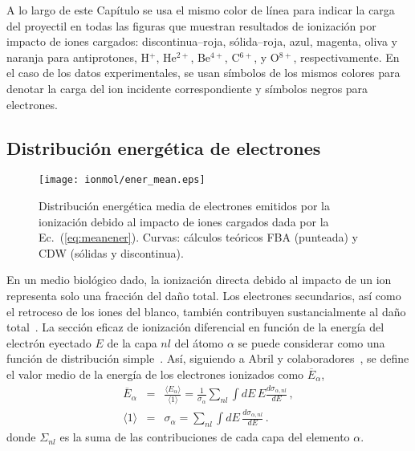 A lo largo de este Capítulo se usa el mismo color de línea para indicar 
la carga del proyectil en todas las figuras que muestran resultados de 
ionización por impacto de iones cargados: discontinua--roja, 
sólida--roja, azul, magenta, oliva y naranja para antiprotones, H$^{+}$, 
He$^{2+}$, Be$^{4+}$, C$^{6+}$, y O$^{8+}$, respectivamente. En el caso 
de los datos experimentales, se usan símbolos de los mismos colores para 
denotar la carga del ion incidente correspondiente y símbolos negros 
para electrones. 

\subsection{Distribución energética de electrones}
\label{subsec:meanener}

\begin{figure}
\centering
\texttt{[image: ionmol/ener\_mean.eps]}
\caption[Distribución energética media de electrones emitidos.]
{Distribución energética media de electrones emitidos por la ionización 
debido al impacto de iones cargados dada por la Ec.~(\ref{eq:meanener}). 
Curvas: cálculos teóricos FBA (punteada) y CDW (sólidas y 
discontinua).}
\label{fig:emittedener}
\end{figure} 

En un medio biológico dado, la ionización directa debido al impacto de 
un ion representa solo una fracción del daño total. Los electrones 
secundarios, así como el retroceso de los iones del blanco, también 
contribuyen sustancialmente al daño total~\cite{Denifl:11}. La sección 
eficaz de ionización diferencial en función de la energía del electrón 
eyectado $E$ de la capa $nl$ del átomo $\alpha$ se puede considerar como 
una función de distribución simple~\cite{Surdutovic:18}. Así, siguiendo 
a Abril y colaboradores~\cite{Abril:15}, se define el valor medio de la 
energía de los electrones ionizados como
$\overline{E}_{\alpha}$, 
\begin{eqnarray}
\overline{E}_{\alpha} &=&\frac{\langle E_{\alpha}\rangle}{\langle
1\rangle}=\frac{1}{\sigma_{\alpha}}\sum\limits_{nl}\int dE\,E
\frac{d\sigma_{\alpha,nl}}{dE}\,,  
\label{eq:meanener} \\
\langle 1\rangle &=&\sigma_{\alpha}=\sum\limits_{nl}\int dE\,
\frac{d\sigma_{\alpha,nl}}{dE}\,. 
\label{eq:normener}
\end{eqnarray}
donde $\Sigma_{nl}$ es la suma de las contribuciones de cada capa del 
elemento $\alpha$.

